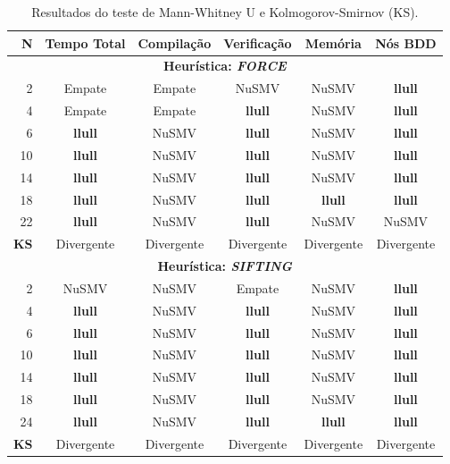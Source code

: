 \documentclass[cic,tc]{infufrgs}
\begin{document}
	\begin{table}[htbp]
		\centering
		\caption{Resultados do teste de Mann-Whitney U e Kolmogorov-Smirnov (KS).}
		\label{tab:estatistica_unificada_dining_heuristics}
		\small 
		\begin{tabular}{rccccc}
			\toprule
			\textbf{N} & \textbf{Tempo Total} & \textbf{Compilação} & \textbf{Verificação} & \textbf{Memória} & \textbf{Nós BDD} \\
			\midrule
			\multicolumn{6}{c}{\textbf{Heurística: \textit{FORCE}}} \\
			\midrule
			2  & Empate         & Empate       & NuSMV          & NuSMV          & \textbf{llull} \\
			4  & Empate         & Empate       & \textbf{llull} & NuSMV          & \textbf{llull} \\
			6  & \textbf{llull} & NuSMV        & \textbf{llull} & NuSMV          & \textbf{llull} \\
			10 & \textbf{llull} & NuSMV        & \textbf{llull} & NuSMV          & \textbf{llull} \\
			14 & \textbf{llull} & NuSMV        & \textbf{llull} & NuSMV          & \textbf{llull} \\
			18 & \textbf{llull} & NuSMV        & \textbf{llull} & \textbf{llull} & \textbf{llull} \\
			22 & \textbf{llull} & NuSMV        & \textbf{llull} & NuSMV          & NuSMV          \\
			\midrule
			\textbf{KS} & Divergente & Divergente & Divergente & Divergente & Divergente \\
			\midrule
			\multicolumn{6}{c}{\textbf{Heurística: \textit{SIFTING}}} \\
			\midrule
			2  & NuSMV          & NuSMV        & Empate         & NuSMV          & \textbf{llull} \\
			4  & \textbf{llull} & NuSMV        & \textbf{llull} & NuSMV          & \textbf{llull} \\
			6  & \textbf{llull} & NuSMV        & \textbf{llull} & NuSMV          & \textbf{llull} \\
			10 & \textbf{llull} & NuSMV        & \textbf{llull} & NuSMV          & \textbf{llull} \\
			14 & \textbf{llull} & NuSMV        & \textbf{llull} & NuSMV          & \textbf{llull} \\
			18 & \textbf{llull} & NuSMV        & \textbf{llull} & NuSMV          & \textbf{llull} \\
			24 & \textbf{llull} & NuSMV        & \textbf{llull} & \textbf{llull} & \textbf{llull} \\
			\midrule
			\textbf{KS} & Divergente & Divergente & Divergente & Divergente & Divergente \\
			\bottomrule
		\end{tabular}
	\end{table}
	
\end{document}

